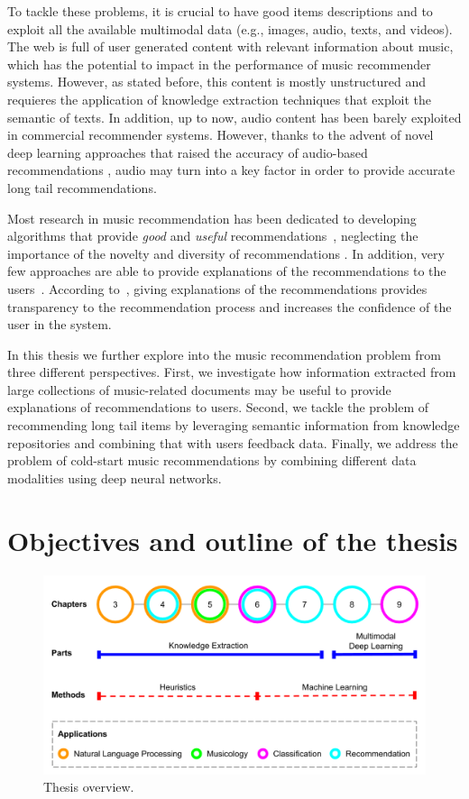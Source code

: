 To tackle these problems, it is crucial to have good items descriptions and to exploit all the available multimodal data (e.g., images, audio, texts, and videos).
The web is full of user generated content with relevant information about music, which has the potential to impact in the performance of music recommender systems. However, as stated before, this content is mostly unstructured and requieres the application of knowledge extraction techniques that exploit the semantic of texts.
In addition, up to now, audio content has been barely exploited in commercial recommender systems. However, thanks to the advent of novel deep learning approaches that raised the accuracy of audio-based recommendations \citep{Oord2013}, audio may turn into a key factor in order to provide accurate long tail recommendations.

Most research in music recommendation has been dedicated to developing algorithms that provide \textit{good} and \textit{useful} recommendations~\citep{oscarBook}, neglecting the importance of the novelty and diversity of recommendations \citep{adomavicius2012improving,Bellogin2010}. In addition, very few approaches are able to provide explanations of the recommendations to the users~\citep{Passant2008, Passant2010}. According to~\cite{celma2008new}, giving explanations of the recommendations provides transparency to the recommendation process and increases the confidence of the user in the system.

In this thesis we further explore into the music recommendation problem from three different perspectives. First, we investigate how information extracted from large collections of music-related documents may be useful to provide explanations of recommendations to users. Second, we tackle the problem of recommending long tail items by leveraging semantic information from knowledge repositories and combining that with users feedback data. Finally, we address the problem of cold-start music recommendations by combining different data modalities using deep neural networks.


\section{Objectives and outline of the thesis}
\label{sec:intro:objectives}

\begin{figure}
	\centering
	\includegraphics[width=\textwidth]{ch01_introduction_pics/Thesis_schema.png}
	\caption{Thesis overview.\label{fig:intro:chapters}}
\end{figure}

